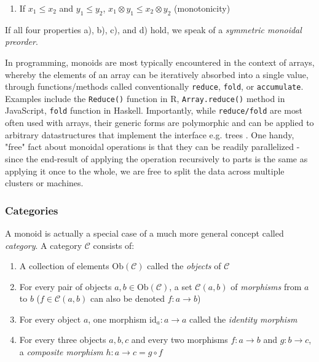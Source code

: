 \documentclass[12pt,a4paper]{article}
\begin{document}
\begin{enumerate}
\renewcommand{\theenumi}{\alph{enumi}}
\setcounter{enumi}{3}
\item If $x_1 \leq x_2$ and $y_1 \leq y_2$, $x_1 \otimes y_1 \leq x_2 \otimes y_2$ (monotonicity)
\end{enumerate}

If all four properties a), b), c), and d) hold, we speak of a \textit{symmetric monoidal preorder}. 

In programming, monoids are most typically encountered in the context of arrays, whereby the elements of an array can be iteratively absorbed into a single value, through functions/methods called conventionally \texttt{reduce}, \texttt{fold}, or \texttt{accumulate}. Examples include the \texttt{Reduce()} function in R, \texttt{Array.reduce()} method in JavaScript, \texttt{fold} function in Haskell. Importantly, while \texttt{reduce/fold} are most often used with arrays, their generic forms are polymorphic and can be applied to arbitrary datastructures that implement the interface e.g. trees \citep{braithwaite2019}. One handy, "free" fact about monoidal operations is that they can be readily parallelized - since the end-result of applying the operation recursively to parts is the same as applying it once to the whole, we are free to split the data across multiple clusters or machines.  

\subsubsection{Categories}
\label{sec:categories}

A monoid is actually a special case of a much more general concept called \textit{category}. A category $\mathcal{C}$ consists of:

\begin{enumerate}
\item A collection of elements $\text{Ob}(\mathcal{C})$ called the \textit{objects} of $\mathcal{C}$
\item For every pair of objects $a, b \in \text{Ob}(\mathcal{C})$, a set $\mathcal{C}(a, b)$ of \textit{morphisms} from $a$ to $b$ ($f \in \mathcal{C}(a, b)$ can also be denoted $f: a \to b$)
\item For every object $a$, one morphism $\text{id}_a : a \to a$ called the \textit{identity morphism}
\item For every three objects $a, b, c$ and every two morphisms $f : a \to b$ and $g : b \to c$, a \textit{composite morphism} $h : a \to c = g \circ f $ 
\end{enumerate}
\end{document}
